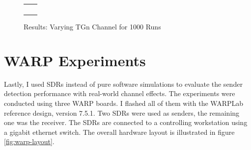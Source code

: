 \begin{figure}[p]
	\centering
	\setlength\figureheight{3cm}
	\setlength{}
	\begin{tabular}{cc}
		\subfloat[MCS 0]{} &
		\subfloat[MCS 1]{} \\
		\subfloat[MCS 2]{} &
		\subfloat[MCS 3]{} \\
		\subfloat[MCS 4]{} &
		\subfloat[MCS 5]{} \\
		\subfloat[MCS 6]{} &
		\subfloat[MCS 7]{} \\
	\end{tabular}
	\caption{Results: Varying TGn Channel for 1000 Runs}
	\label{fig:vary_tgn}
\end{figure}



\section{WARP Experiments}\label{sec:ex-warp}

Lastly, I used \glspl{SDR} instead of pure software simulations to evaluate the sender detection performance with real-world channel effects. The experiments were conducted using three \gls{WARP} boards. I flashed all of them with the WARPLab reference design, version 7.5.1. Two \glspl{SDR} were used as senders, the remaining one was the receiver. The \glspl{SDR} are connected to a controlling workstation using a gigabit ethernet switch. The overall hardware layout is illustrated in figure \ref{fig:warp-layout}.

